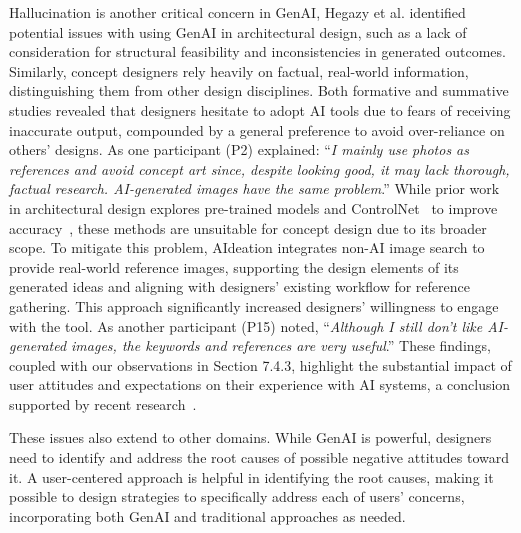 Hallucination is another critical concern in GenAI, 
Hegazy et al.\cite{hegazy2023evolution} identified potential issues with using GenAI in architectural design, such as a lack of consideration for structural feasibility and inconsistencies in generated outcomes. Similarly, concept designers rely heavily on factual, real-world information\cite{maleki2024ai, monteith2024artificial}, distinguishing them from other design disciplines. Both formative and summative studies revealed that designers hesitate to adopt AI tools due to fears of receiving inaccurate output, compounded by a general preference to avoid over-reliance on others' designs. As one participant (P2) explained: “\textit{I mainly use photos as references and avoid concept art since, despite looking good, it may lack thorough, factual research. AI-generated images have the same problem}.” 
While prior work in architectural design explores pre-trained models and ControlNet~\cite{zhang2023adding} to improve accuracy~\cite{chen2024enhancing}, these methods are unsuitable for concept design due to its broader scope.
To mitigate this problem, AIdeation integrates non-AI image search to provide real-world reference images, supporting the design elements of its generated ideas and aligning with designers' existing workflow for reference gathering. This approach significantly increased designers' willingness to engage with the tool. As another participant (P15) noted, “\textit{Although I still don't like AI-generated images, the keywords and references are very useful}.” These findings, coupled with our observations in Section 7.4.3, highlight the substantial impact of user attitudes and expectations on their experience with AI systems, a conclusion supported by recent research~\cite{kang2024impact}.


These issues also extend to other domains. While GenAI is powerful, designers need to identify and address the root causes of possible negative attitudes toward it. A user-centered approach is helpful in identifying the root causes, making it possible to design strategies to specifically address each of users' concerns, incorporating both GenAI and traditional approaches as needed. 

